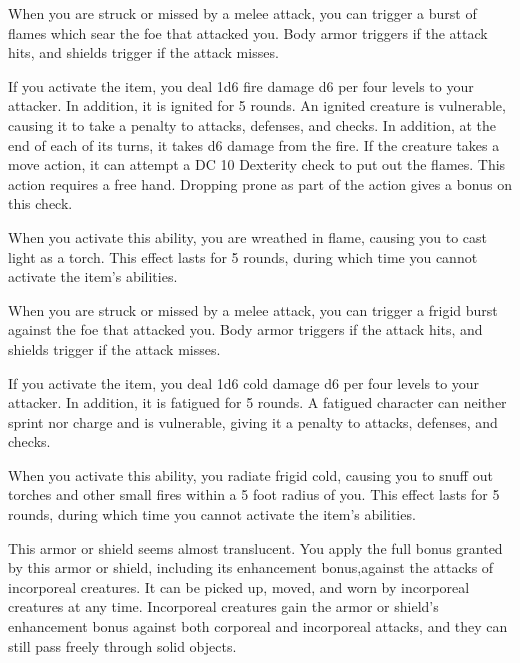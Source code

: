 
 When you are struck or missed by a melee attack, you can trigger a burst of flames which sear the foe that attacked you. Body armor triggers if the attack hits, and shields trigger if the attack misses.

If you activate the item, you deal 1d6 fire damage \add d6 per four levels to your attacker. In addition, it is ignited for 5 rounds. An ignited creature is vulnerable, causing it to take a  penalty to attacks, defenses, and checks. In addition, at the end of each of its turns, it takes d6 damage from the fire. If the creature takes a move action, it can attempt a DC 10 Dexterity check to put out the flames. This action requires a free hand. Dropping prone as part of the action gives a  bonus on this check.

When you activate this ability, you are wreathed in flame, causing you to cast light as a torch. This effect lasts for 5 rounds, during which time you cannot activate the item's abilities.


 When you are struck or missed by a melee attack, you can trigger a frigid burst against the foe that attacked you. Body armor triggers if the attack hits, and shields trigger if the attack misses.

If you activate the item, you deal 1d6 cold damage \add d6 per four levels to your attacker. In addition, it is fatigued for 5 rounds. A fatigued character can neither sprint nor charge and is vulnerable, giving it a  penalty to attacks, defenses, and checks.

When you activate this ability, you radiate frigid cold, causing you to snuff out torches and other small fires within a 5 foot radius of you. This effect lasts for 5 rounds, during which time you cannot activate the item's abilities.


 This armor or shield seems almost translucent. You apply the full bonus granted by this armor or shield, including its enhancement bonus,against the attacks of incorporeal creatures. It can be picked up, moved, and worn by incorporeal creatures at any time. Incorporeal creatures gain the armor or shield's enhancement bonus against both corporeal and incorporeal attacks, and they can still pass freely through solid objects.

